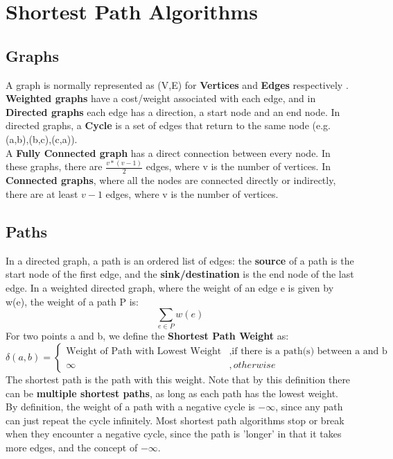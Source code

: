 \section{Shortest Path Algorithms}

\subsection{Graphs}
A graph is normally represented as (V,E) for \textbf{Vertices} and \textbf{Edges} respectively . \textbf{Weighted graphs} have a cost/weight associated with each edge, and in \textbf{Directed graphs} each edge has a direction, a start node and an end node. In directed graphs, a \textbf{Cycle} is a set of edges that return to the same node (e.g. (a,b),(b,c),(c,a)). \\
A \textbf{Fully Connected graph} has a direct connection between every node. In these graphs, there are $\frac{v*(v-1)}{2}$ edges, where v is the number of vertices. In \textbf{Connected graphs}, where all the nodes are connected directly or indirectly, there are at least $v-1$ edges, where v is the number of vertices. 

\subsection{Paths}
In a directed graph, a path is an ordered list of edges: the \textbf{source} of a path is the start node of the first edge, and the \textbf{sink/destination} is the end node of the last edge. In a weighted directed graph, where the weight of an edge e is given by w(e), the weight of a path P is:
\begin{equation}
    \sum_{e\in P} w(e)
\end{equation}
For two points a and b, we define the \textbf{Shortest Path Weight} as:
\begin{equation}
    \delta(a,b) = 
    \begin{cases}
    \text{Weight of Path with Lowest Weight} &, \text{if there is a path(s) between a and b} \\
    \infty &,otherwise 
    \end{cases}
\end{equation}
The shortest path is the path with this weight. Note that by this definition there can be \textbf{multiple shortest paths}, as long as each path has the lowest weight. \\
By definition, the weight of a path with a negative cycle is $-\infty$, since any path can just repeat the cycle infinitely. Most shortest path algorithms stop or break when they encounter a negative cycle, since the path is 'longer' in that it takes more edges, and the concept of $-\infty$.


